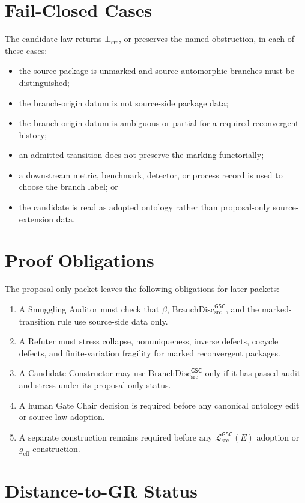 \documentclass[11pt]{article}
\newcommand{\MetricData}{\mathcal{L}_{\mathrm{src}}^{\mathsf{GSC}}}
\newcommand{\BottomSrc}{\bot_{\mathrm{src}}}
\newcommand{\geff}{g_{\mathrm{eff}}}
\newcommand{\BranchDisc}{\mathrm{BranchDisc}_{\mathrm{src}}^{\mathsf{GSC}}}
\begin{document}
\section{Fail-Closed Cases}

The candidate law returns \(\BottomSrc\), or preserves the named obstruction,
in each of these cases:
\begin{itemize}[leftmargin=*]
  \item the source package is unmarked and source-automorphic branches must be
  distinguished;
  \item the branch-origin datum is not source-side package data;
  \item the branch-origin datum is ambiguous or partial for a required
  reconvergent history;
  \item an admitted transition does not preserve the marking functorially;
  \item a downstream metric, benchmark, detector, or process record is used to
  choose the branch label; or
  \item the candidate is read as adopted ontology rather than proposal-only
  source-extension data.
\end{itemize}

\section{Proof Obligations}

The proposal-only packet leaves the following obligations for later packets:
\begin{enumerate}[leftmargin=*]
  \item A Smuggling Auditor must check that \(\beta\), \(\BranchDisc\), and the
  marked-transition rule use source-side data only.
  \item A Refuter must stress collapse, nonuniqueness, inverse defects,
  cocycle defects, and finite-variation fragility for marked reconvergent
  packages.
  \item A Candidate Constructor may use \(\BranchDisc\) only if it has passed
  audit and stress under its proposal-only status.
  \item A human Gate Chair decision is required before any canonical ontology
  edit or source-law adoption.
  \item A separate construction remains required before any \(\MetricData(E)\)
  adoption or \(\geff\) construction.
\end{enumerate}

\section{Distance-to-GR Status}
\end{document}
